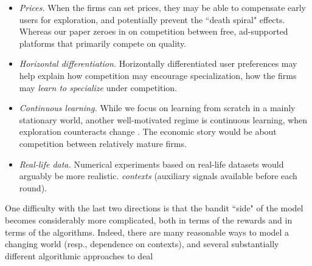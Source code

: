 \documentclass[../competing_bandits.tex]{subfiles}
\begin{document}
\begin{itemize}

\item \emph{Prices.}
When the firms can set prices, they may be able to compensate early users for exploration, and potentially prevent the ``death spiral" effects. Whereas our paper zeroes in on competition between free, ad-supported platforms that primarily compete on quality.

\item \emph{Horizontal differentiation.}
Horizontally differentiated user preferences may help explain how competition may encourage specialization, \ie how the firms may \emph{learn to specialize} under competition.


\item \emph{Continuous learning.}
While we focus on learning from scratch in a mainly stationary world, another well-motivated regime is continuous learning, when exploration counteracts change
\citep{DynamicMAB-colt08}.
The economic story would be about competition between relatively mature firms.

\item \emph{Real-life data.}
Numerical experiments based on real-life datasets would arguably be more realistic.  \emph{contexts} (auxiliary signals available before each round).

\end{itemize}

\noindent One difficulty with the last two directions is that the bandit ``side" of the model becomes considerably more complicated, both in terms of the rewards and in terms of the algorithms. Indeed, there are many reasonable ways to model a changing world (resp., dependence on  contexts), and several substantially different algorithmic approaches to deal 
\end{document}
